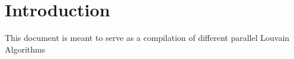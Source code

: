 \documentclass[12pt]{report}
\begin{document}
\chapter{Introduction}
This document is meant to serve as a compilation of different parallel Louvain Algorithms
\end{document}
